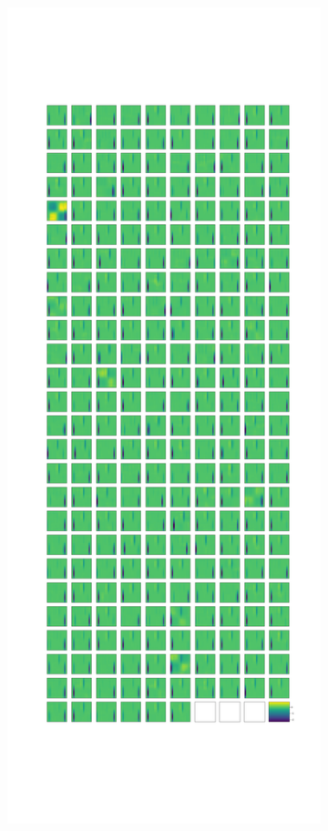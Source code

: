 \begin{figure}
    \centering
    \begin{subfigure}{0.45\textwidth}
        \centering
        \includegraphics[width=\textwidth]{images/stripes/test_img_9/leaky_re_lu_5.png}

\end{subfigure}
\end{figure}
